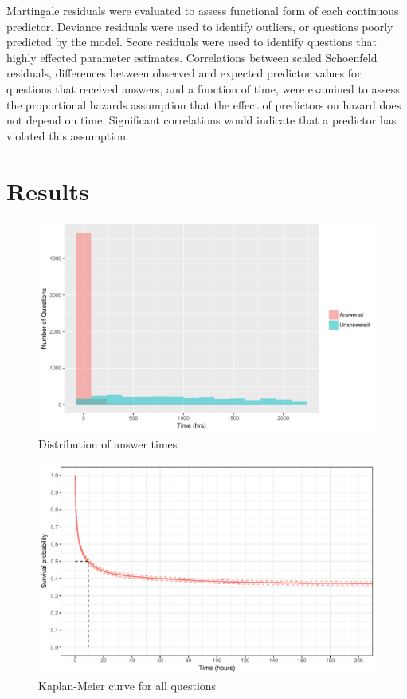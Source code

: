 \documentclass{article}
\begin{document}
Martingale residuals were evaluated to assess functional form of each continuous predictor. Deviance residuals were used to identify outliers, or questions poorly predicted by the model. Score residuals were used to identify questions that highly effected parameter estimates. Correlations between scaled Schoenfeld residuals, differences between observed and expected predictor values for questions that received answers, and a function of time, were examined to assess the proportional hazards assumption that the effect of predictors on hazard does not depend on time. Significant correlations would indicate that a predictor has violated this assumption. 


\section*{Results}


\begin{figure}[h!]
  \includegraphics[scale=1]{times_dist.pdf}
  \caption{Distribution of answer times}
  \label{fig:answertimes}
\end{figure}

\begin{figure}[h!]
  \includegraphics[scale=1]{kmcurve.pdf}
  \caption{Kaplan-Meier curve for all questions}
  \label{fig:kmcurve}
\end{figure}
\end{document}
